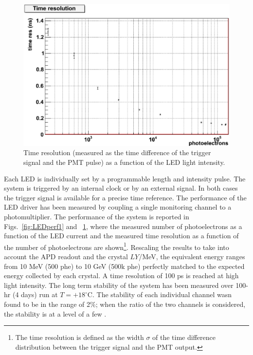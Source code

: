 \begin{figure}[th!]
\centering 
\includegraphics[width=1.0\columnwidth]{./fig/timing.eps}
\caption{Time resolution (measured as the time difference of the trigger signal and the PMT pulse) as a function of the LED light intensity.}
\label{fig:LEDperf2} 
\end{figure}
Each LED is individually set by a programmable
length and intensity pulse. The
system is triggered by an internal clock or by
an external signal. In both cases the trigger
signal is available for a precise time reference.
The performance of the LED driver
has been measured by coupling a single monitoring
channel to a photomultiplier. The performance of the system is reported in Figs.~\ref{fig:LEDperf1} and ~\ref{fig:LEDperf2}, where the measured number of photoelectrons
as a function of the LED current and the measured time resolution as
a function of the number of photoelectrons are shown\footnote{The time resolution is defined as the width $\sigma$  of the time difference distribution
between the trigger signal and the
PMT output.}. Rescaling the 
results to take into account the APD readout
and the crystal $LY$/MeV, the equivalent
energy ranges from 10 MeV (500 phe) to 10
GeV (500k phe) perfectly matched to the expected
energy collected by each crystal. A time resolution
of 100 ps is reached at high light
intensity. The long term stability of the system has been measured over 100-hr (4 days) run at
$T=+18^\circ$C. The stability of each individual
channel wasn found to be in the range of 2$\%$;  when the ratio
of the two channels is considered,
the stability is at a level of a few \textperthousand.

